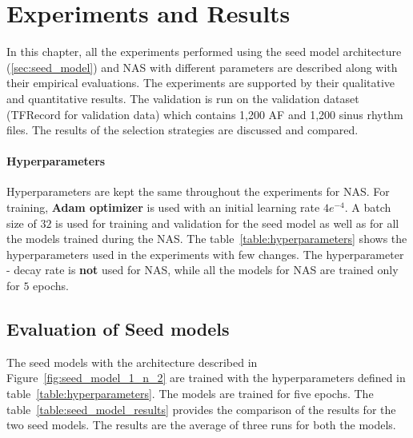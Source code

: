 \chapter{Experiments and Results}
\label{chap:experiments_and_results}

In this chapter, all the experiments performed using the seed model architecture (\autoref{sec:seed_model}) and NAS with different parameters are described along with their empirical evaluations. The experiments are supported by their qualitative and quantitative results. The validation is run on the validation dataset (TFRecord for validation data) which contains 1,200 AF and 1,200 sinus rhythm files. The results of the selection strategies are discussed and compared.

\subsubsection{Hyperparameters}

Hyperparameters are kept the same throughout the experiments for NAS. For training, \textbf{Adam optimizer} is used with an initial learning rate $4e^{-4}$. A batch size of $32$ is used for training and validation for the seed model as well as for all the models trained during the NAS. The table~\ref{table:hyperparameters} shows the hyperparameters used in the experiments with few changes. The hyperparameter - decay rate is \textbf{not} used for NAS, while all the models for NAS are trained only for $5$ epochs.

\section{Evaluation of Seed models}
\label{sec:seed_model_experiments}

The seed models with the architecture described in Figure~\ref{fig:seed_model_1_n_2} are trained with the hyperparameters defined in table~\ref{table:hyperparameters}. The models are trained for five epochs. The table~\ref{table:seed_model_results} provides the comparison of the results for the two seed models. The results are the average of three runs for both the models. 

